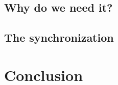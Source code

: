 \documentclass[11pt]{report} %
\begin{document}
\section{Why do we need it?}
%
%
\section{The synchronization}
%
% 

\chapter*{Conclusion}
%
%
%
%



\end{document}
